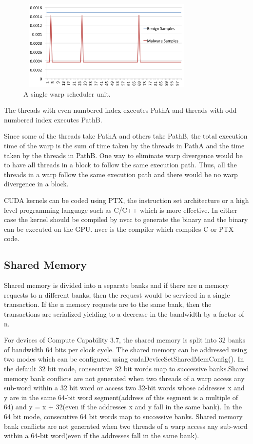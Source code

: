 \begin{figure}
	\centering
	\includegraphics[width=9cm, height=4.5cm]{500.png}
	\caption{A single warp scheduler unit\cite{bib1}.}
	\label{fig:warpdivergence}
\end{figure}

The threads with even numbered index executes PathA and threads with odd numbered index executes PathB.

Since some of the threads take PathA and others take PathB, the total execution time of the warp is the sum of time taken by the threads in PathA and the time taken by the threads in PathB. One way to eliminate warp divergence would be to have all threads in a block to follow the same execution path. Thus, all the threads in a warp follow the same execution path and there would be no warp divergence in a block.

CUDA kernels can be coded using PTX, the instruction set architecture or a high level programming language such as C/C++ which is more effective. In either case the kernel should be compiled by nvcc to generate the binary and the binary can be executed on the GPU. nvcc is the compiler which compiles C or PTX code. 

\subsection{Shared Memory}

Shared memory is divided into n separate banks and if there are n memory requests to n different banks, then the request would be serviced in a single transaction. If the n memory requests are to the same bank, then the transactions are serialized yielding to a decrease in the bandwidth by a factor of n.

For devices of Compute Capability 3.7, the shared memory is split into 32 banks of bandwidth 64 bits per clock cycle. The shared memory can be addressed using two modes which can be configured using cudaDeviceSetSharedMemConfig(). In the default 32 bit mode, consecutive 32 bit words map to successive banks.Shared memory bank conflicts are not generated when two threads of a warp access any sub-word within a 32 bit word or access two 32-bit words whose addresses x and y are in the same 64-bit word segment(address of this segment is a multiple of 64) and y = x + 32(even if the addresses x and y fall in the same bank). In the 64  bit mode, consecutive 64 bit words map to successive banks. Shared memory bank conflicts are not generated when two threads of a warp access any sub-word within a 64-bit word(even if the addresses  fall in the same bank). 


